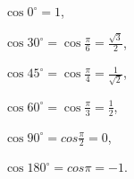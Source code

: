 $\cos 0^{\circ} = 1$, 
\par
$\cos 30^{\circ} = \cos \frac{\pi}{6} = \frac{\sqrt{3}}{2}$,
\par
$\cos 45^{\circ} = \cos \frac{\pi}{4} = \frac{1}{\sqrt{2}}$,
\par
$\cos 60^{\circ} = \cos \frac{\pi}{3} = \frac{1}{2}$,
\par
$\cos 90^{\circ} = cos \frac{\pi}{2} = 0$,
\par
$\cos 180^{\circ} = cos \pi = -1$.
